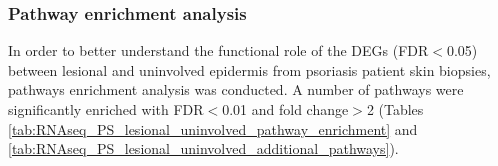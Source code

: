 


\subsubsection{Pathway enrichment analysis}

In order to better understand the functional role of the DEGs (FDR$<$0.05) between lesional and uninvolved epidermis from psoriasis patient skin biopsies, pathways enrichment analysis was conducted. A number of pathways were significantly enriched with FDR$<$0.01 and fold change$>$2 (Tables \ref{tab:RNAseq_PS_lesional_uninvolved_pathway_enrichment} and \ref{tab:RNAseq_PS_lesional_uninvolved_additional_pathways}). 


